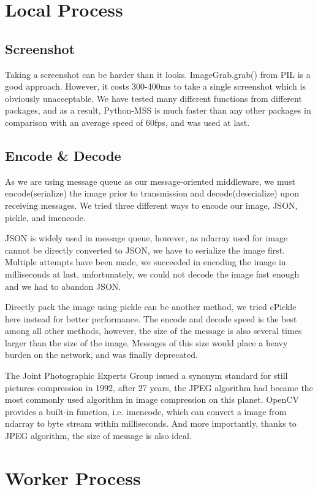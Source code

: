 \documentclass[runningheads]{llncs}
\begin{document}
\section{Local Process}
\subsection{Screenshot}
Taking a screenshot can be harder than it looks. 
ImageGrab.grab() from PIL is a good approach. However, 
it costs 300-400ms to take a single screenshot which is 
obviously unacceptable. We have tested many different functions 
from different packages, and as a result, Python-MSS is much 
faster than any other packages in comparison with an 
average speed of 60fps, and was used at last.

\subsection{Encode \& Decode}
As we are using message queue as our message-oriented 
middleware, we must encode(serialize) the image prior to 
transmission and decode(deserialize) upon receiving messages. 
We tried three different ways to encode our image, JSON, 
pickle, and imencode. 

JSON is widely used in message queue, however, as ndarray 
used for image cannot be directly converted to JSON, we have 
to serialize the image first. Multiple attempts have been 
made, we succeeded in encoding the image in milliseconds at last, 
unfortunately, we could not decode the image fast enough 
and we had to abandon JSON. 

Directly pack the image using pickle can be another method, 
we tried cPickle here instead for better performance. The 
encode and decode speed is the best among all other methods, 
however, the size of the message is also several times 
larger than the size of the image. Messages of this size 
would place a heavy burden on the network, and was finally 
deprecated. 

The Joint Photographic Experts Group issued a synonym 
standard for still pictures compression in 1992, after 
27 years, the JPEG algorithm had became the most commonly 
used algorithm in image compression on this planet. OpenCV 
provides a built-in function, i.e. imencode, which can 
convert a image from ndarray to byte stream within 
milliseconds. And more importantly, thanks to JPEG 
algorithm, the size of message is also ideal. 


\section{Worker Process}
\end{document}
